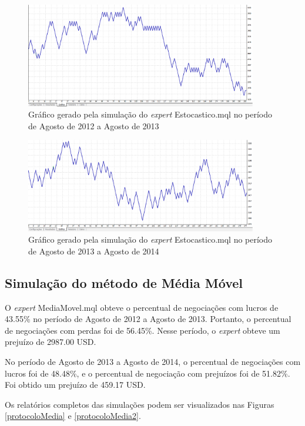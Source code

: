 \begin{figure}[H]
\centering
\includegraphics[width=0.9\textwidth]{figuras/protocoloEst3}
\caption{Gráfico gerado pela simulação do \textit{expert} Estocastico.mql no período de Agosto de 2012 a Agosto de 2013} 
\label{protocoloEst3}
\end{figure}

\begin{figure}[H]
\centering
\includegraphics[width=0.9\textwidth]{figuras/protocoloEst4}
\caption{Gráfico gerado pela simulação do \textit{expert} Estocastico.mql no período de Agosto de 2013 a Agosto de 2014} 
\label{protocoloEst4}
\end{figure}

\subsection{Simulação do método de Média Móvel}

O \textit{expert} MediaMovel.mql obteve o percentual de negociações com lucros de 43.55\% no período de Agosto de 2012 a Agosto de 2013. Portanto, o percentual de negociações com perdas foi de 56.45\%. Nesse período, o \textit{expert} obteve um prejuízo de 2987.00 USD. 

No período de Agosto de 2013 a Agosto de  2014, o percentual de negociações com lucros foi de 48.48\%, e o percentual de negociação com prejuízos foi de 51.82\%.  Foi obtido um prejuízo de 459.17 USD. 

Os relatórios completos das simulações podem ser visualizados nas Figuras \ref{protocoloMedia} e \ref{protocoloMedia2}.

